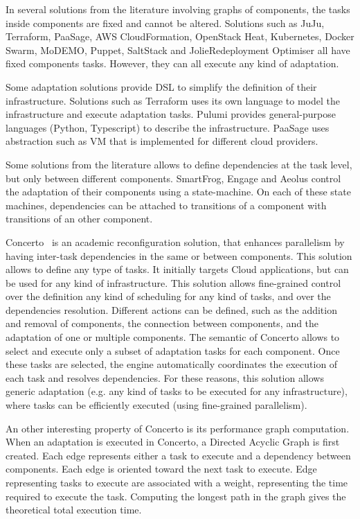 \documentclass{article}
\begin{document}
In several solutions from the literature involving graphs of components, the tasks inside components are fixed and cannot be altered. Solutions such as JuJu, Terraform, PaaSage, AWS CloudFormation, OpenStack Heat, Kubernetes, Docker Swarm, MoDEMO, Puppet, SaltStack and JolieRedeployment Optimiser all have fixed components tasks. However, they can all execute any kind of adaptation.

Some adaptation solutions provide DSL to simplify the definition of their infrastructure. Solutions such as Terraform uses its own language to model the infrastructure and execute adaptation tasks. Pulumi provides general-purpose languages (Python, Typescript) to describe the infrastructure. PaaSage uses abstraction such as VM that is implemented for different cloud providers.

Some solutions from the literature allows to define dependencies at the task level, but only between different components. SmartFrog, Engage and Aeolus control the adaptation of their components using a state-machine. On each of these state machines, dependencies can be attached to transitions of a component with transitions of an other component.

Concerto~\cite{chardet_toward_2021} is an academic reconfiguration solution, that enhances parallelism by having inter-task dependencies in the same or between components. This solution allows to define any type of tasks. It initially targets Cloud applications, but can be used for any kind of infrastructure. This solution allows fine-grained control over the definition any kind of scheduling for any kind of tasks, and over the dependencies resolution. Different actions can be defined, such as the addition and removal of components, the connection between components, and the adaptation of one or multiple components. The semantic of Concerto allows to select and execute only a subset of adaptation tasks for each component. Once these tasks are selected, the engine automatically coordinates the execution of each task and resolves dependencies. For these reasons, this solution allows generic adaptation (e.g. any kind of tasks to be executed for any infrastructure), where tasks can be efficiently executed (\ie using fine-grained parallelism).

An other interesting property of Concerto is its performance graph computation. When an adaptation is executed in Concerto, a Directed Acyclic Graph is first created. Each edge represents either a task to execute and a dependency between components. Each edge is oriented toward the next task to execute. Edge representing tasks to execute are associated with a weight, representing the time required to execute the task. Computing the longest path in the graph gives the theoretical total execution time.
\end{document}
